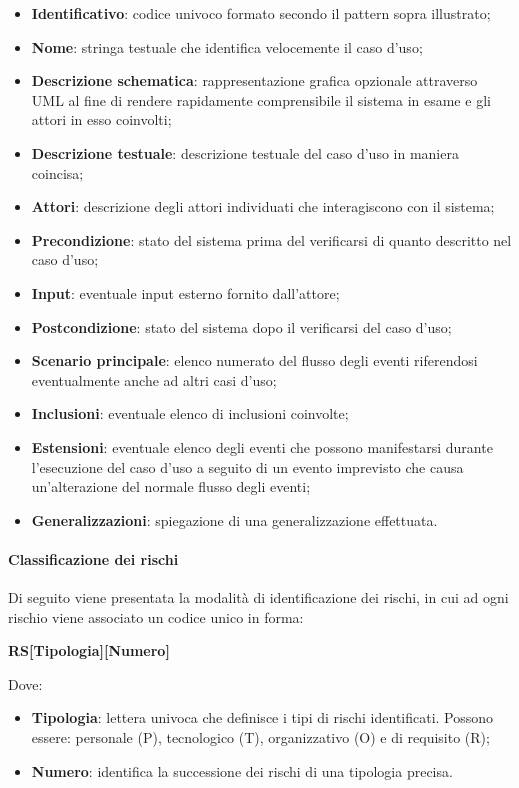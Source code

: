 \begin{itemize}
  \item \textbf{Identificativo}: codice univoco formato secondo il pattern sopra illustrato;
  \item \textbf{Nome}: stringa testuale che identifica velocemente il caso d'uso;
  \item \textbf{Descrizione schematica}: rappresentazione grafica opzionale attraverso UML al fine di rendere rapidamente comprensibile il sistema in esame e gli attori in esso coinvolti;
  \item \textbf{Descrizione testuale}: descrizione testuale del caso d'uso in maniera coincisa;
  \item \textbf{Attori}: descrizione degli attori individuati che interagiscono con il sistema;
  \item \textbf{Precondizione}: stato del sistema prima del verificarsi di quanto descritto nel caso d'uso;
  \item \textbf{Input}: eventuale input esterno fornito dall'attore;
  \item \textbf{Postcondizione}: stato del sistema dopo il verificarsi del caso d'uso;
  \item \textbf{Scenario principale}: elenco numerato del flusso degli eventi riferendosi eventualmente anche ad altri casi d'uso;
  \item \textbf{Inclusioni}: eventuale elenco di inclusioni coinvolte;
  \item \textbf{Estensioni}: eventuale elenco degli eventi che possono manifestarsi durante l'esecuzione del caso d'uso a seguito di un evento imprevisto che causa un'alterazione del normale flusso degli eventi;
  \item \textbf{Generalizzazioni}: spiegazione di una generalizzazione effettuata.
\end{itemize}

\paragraph{Classificazione dei rischi} \label{_classificazioneDeiRischi}
Di seguito viene presentata la modalità di identificazione dei rischi, in cui ad ogni rischio viene associato un codice unico in forma:
\begin{center}
  \textbf{RS[Tipologia][Numero]}
\end{center}
Dove:
\begin{itemize}
  \item \textbf{Tipologia}: lettera univoca che definisce i tipi di rischi identificati.
        \newline Possono essere: personale (P), tecnologico (T), organizzativo (O) e di requisito (R);
  \item \textbf{Numero}: identifica la successione dei rischi di una tipologia precisa.
\end{itemize}


